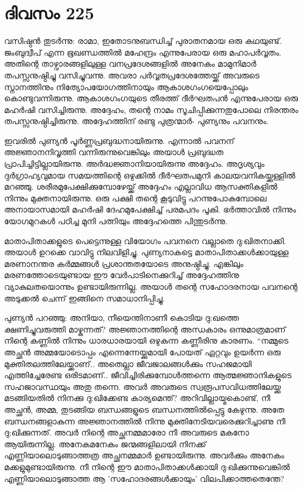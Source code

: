 \section{ദിവസം 225}


വസിഷ്ഠൻ തുടർന്നു: രാമാ, ഇതോടനുബന്ധിച്ച് പുരാതനമായ ഒരു കഥയുണ്ട്. ജംബുദ്വീപ് എന്ന ഭൂഖണ്ഡത്തിൽ മഹേന്ദ്രം എന്നുപേരായ ഒരു മഹാപർവ്വതം. അതിന്റെ താഴ്വാരങ്ങളിലുള്ള വനപ്രദേശങ്ങളിൽ അനേകം മാമുനിമാർ തപസ്സനുഷ്ഠിച്ചു വസിച്ചുവന്നു. അവരാ പർവ്വതപ്രദേശത്തേയ്ക്ക് അവരുടെ സ്നാനത്തിനും നിത്യോപയോഗത്തിനായും ആകാശഗംഗയെപ്പോലും കൊണ്ടുവന്നിരുന്നു. ആകാശഗംഗയുടെ തീരത്ത് ദീർഘതപൻ എന്നുപേരായ ഒരു മഹർഷി വസിച്ചിരുന്നു. അദ്ദേഹം, തന്റെ നാമം സൂചിപ്പിക്കുന്നതുപോലെ നിരന്തരം തപസ്സനുഷ്ഠിച്ചിരുന്നു. അദ്ദേഹത്തിന്‌ രണ്ടു പുത്രന്മാർ- പുണ്യനും പവനനും.

ഇവരിൽ പുണ്യൻ പൂർണ്ണപ്രബുദ്ധനായിരുന്നു. എന്നാൽ പവനന്‌ അജ്ഞാനനിവൃത്തി വന്നിരുന്നുവെങ്കിലും അയാള്‍ പ്രബുദ്ധത പ്രാപിച്ചിട്ടില്ലായിരുന്നു. അർദ്ധജ്ഞാനിയായിരുന്നു അദ്ദേഹം. അദൃശ്യവും ദുർഗ്രാഹ്യവുമായ സമയത്തിന്റെ ഒഴുക്കിൽ ദീർഘതപമുനി കാലയവനികയ്ക്കുള്ളിൽ മറഞ്ഞു. ശരീരമുപേക്ഷിക്കുമ്പോഴേയ്ക്ക് അദ്ദേഹം എല്ലാവിധ ആസക്തികളിൽ നിന്നും മുക്തനായിരുന്നു. ഒരു പക്ഷി തന്റെ കൂടുവിട്ടു പറന്നുപോകുമ്പോലെ അനായാസമായി മഹർഷി ദേഹമുപേക്ഷിച്ച് പരമപദം പൂകി. ഭർത്താവിൽ നിന്നും യോഗമുറകൾ പഠിച്ച മുനി പത്നിയും അദ്ദേഹത്തെ പിന്തുടർന്നു.

മാതാപിതാക്കളുടെ പെട്ടെന്നുള്ള വിയോഗം പവനനെ വല്ലാതെ ദു:ഖിതനാക്കി. അയാൾ ഉറക്കെ വാവിട്ടു നിലവിളിച്ചു. പുണ്യനാകട്ടെ മാതാപിതാക്കൾക്കായുള്ള മരണാനന്തര കർമ്മങ്ങൾ പ്രശാന്തതയോടെ അനുഷ്ഠിച്ചു. എങ്കിലും മരണത്തോടെയുണ്ടായ ഈ വേർപാടിനെക്കുറിച്ച് അദ്ദേഹത്തിനു വ്യാകുലതയൊന്നും ഉണ്ടായിരുന്നില്ല. അയാൾ തന്റെ സഹോദരനായ പവനന്റെ അടുക്കൽ ചെന്ന് ഇങ്ങിനെ സമാധാനിപ്പിച്ചു.

പുണ്യൻ പറഞ്ഞു: അനിയാ, നീയെന്തിനാണീ കൊടിയ ദു:ഖത്തെ ക്ഷണിച്ചുവരുത്തി മാഴ്കുന്നത്? അജ്ഞാനത്തിന്റെ അന്ധകാരം ഒന്നുമാത്രമാണ്‌ നിന്റെ കണ്ണിൽ നിന്നും ധാരധാരയായി ഒഴുകുന്ന കണ്ണീരിനു കാരണം. “നമ്മുടെ അച്ഛൻ അമ്മയോടൊപ്പം എന്നെന്നേയ്ക്കുമായി പോയത് ഏറ്റവും ഉയർന്ന ഒരു മുക്തിതലത്തിലേയ്ക്കാണ്‌.. അതെല്ലാ ജീവജാലങ്ങൾക്കും സഹജമായി എത്തിച്ചേരേണ്ട ഒരിടമാണ്‌.. ജീവിച്ചിരിക്കുമ്പോൾത്തന്നെ ആത്മജ്ഞാനികളുടെ സഹജാവസ്ഥയും അതു തന്നെ. അവർ അവരുടെ സ്വരൂപസവിധത്തിലേയ്ക്കു മടങ്ങിയതിൽ നിനക്കു ദു:ഖിക്കേണ്ട കാര്യമെന്ത്?  അറിവില്ലായ്മകൊണ്ട്, നീ അച്ഛൻ, അമ്മ, തുടങ്ങിയ ബന്ധങ്ങളുടെ ബന്ധനത്തിൽപ്പെട്ടു കേഴുന്നു. അതേ ബന്ധനങ്ങളാകുന്ന അജ്ഞാനത്തിൽ നിന്നു മുക്തിനേടിയവരെക്കുറിച്ചാണു നീ ദു:ഖിക്കുന്നത്. അവർ നിന്റെ അച്ഛനമ്മമാരോ നീ അവരുടെ മകനോ ആയിരുന്നില്ല. അനേകമനേകം ജന്മങ്ങളിലായി നിനക്ക് എണ്ണിയാലൊടുങ്ങാത്തത്ര അച്ഛനമ്മമാർ ഉണ്ടായിരുന്നു. അവർക്കും അനേകം മക്കളുമുണ്ടായിരുന്നു.  നീ നിന്റെ ഈ മാതാപിതാക്കൾക്കായി ദു:ഖിക്കുന്നുവെങ്കിൽ എണ്ണിയാലൊടുങ്ങാത്ത ആ 'സഹോദരങ്ങള്‍ക്കായും' വിലപിക്കാത്തതെന്തേ?

